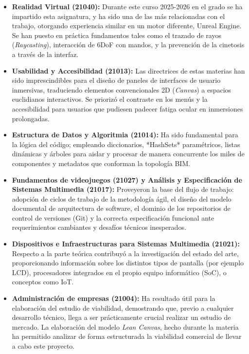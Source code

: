 \begin{itemize}
\item \textbf{Realidad Virtual (21040):} Durante este curso 2025-2026 en el grado se ha impartido esta asignatura, y ha sido una de las más relacionadas con el trabajo, otorgando experiencia similar en un motor diferente, Unreal Engine. Se han puesto en práctica fundamentos tales como el trazado de rayos (\textit{Raycasting}), interacción de 6DoF con mandos, y la prevención de la cinetosis a través de la interfaz.
\item \textbf{Usabilidad y Accesibilidad (21013):} Las directrices de estas materias han sido imprescindibles para el diseño de paneles de interfaces de usuario inmersivas, traduciendo elementos convencionales 2D (\textit{Canvas}) a espacios euclidianos interactivos. Se priorizó el contraste en los menús y la accesibilidad para usuarios que pudiesen padecer fatiga ocular en inmersiones prolongadas.
\item \textbf{Estructura de Datos y Algoritmia (21014):} Ha sido fundamental para la lógica del código; empleando diccionarios, *HashSets* paramétricos, listas dinámicas y árboles para aislar y procesar de manera concurrente los miles de componentes y metadatos que conforman la topología BIM.
\item \textbf{Fundamentos de videojuegos (21027) y Análisis y Especificación de Sistemas Multimedia (21017):} Proveyeron la base del flujo de trabajo: adopción de ciclos de trabajo de la metodología ágil, el diseño del modelo documental de arquitectura de software, el dominio de los repositorios de control de versiones (Git) y la correcta especificación funcional ante requerimientos cambiantes y desafíos técnicos inesperados.
\item \textbf{Dispositivos e Infraestructuras para Sistemas Multimedia (21021):} Respecto a la parte teórica contribuyó a la investigación del estado del arte, proporcionando información sobre los distintos tipos de pantalla (por ejemplo LCD), procesadores integrados en el propio equipo informático (SoC), o conceptos como IoT.
\item \textbf{Administración de empresas (21004):} Ha resultado útil para la elaboración del estudio de viabilidad, demostrando que, previo a cualquier desarrollo técnico, llega a ser prácticamente crucial realizar un estudio de mercado. La elaboración del modelo \textit{Lean Canvas}, hecho durante la materia ha permitido analizar de forma estructurada la viabilidad comercial de llevar a cabo este proyecto.
\end{itemize}